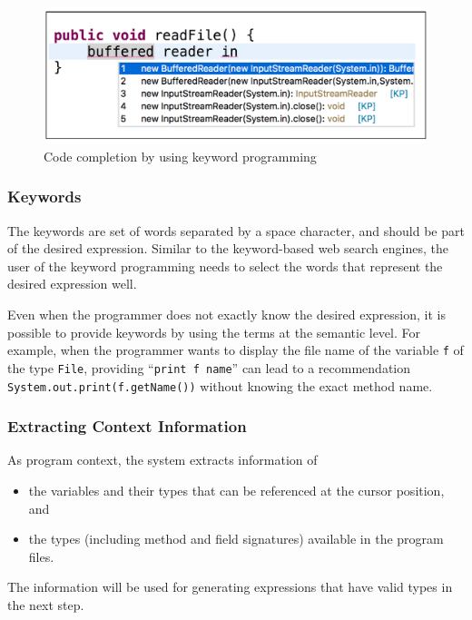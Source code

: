 \documentclass[PRO,english]{ipsj}
\begin{document}
\begin{figure}[!ht]
\centering
\includegraphics[scale=0.38]{Figure/KeywordProgrammingExample.pdf}
\caption{Code completion by using keyword programming}
\label{fig:KP}
\end{figure}

\subsubsection{Keywords}

The keywords are set of words separated by a space character, and should be part of the desired expression.  Similar to the keyword-based web search engines, the user of the keyword programming needs to select the words that represent the desired expression well.

Even when the programmer does not exactly know the desired expression, it is possible to provide keywords by using the terms at the semantic level.  For example, when the programmer wants to display the file name of the variable \texttt{f} of the type \texttt{File}, providing ``\texttt{print f name}'' can lead to a recommendation \texttt{System.out.print(f.getName())} without knowing the exact method name.


\subsubsection{Extracting Context Information}
As program context, the system extracts information of
\begin{itemize}
\item the variables and their types that can be referenced at the cursor position, and 
\item the types (including method and field signatures) available in the program files.
\end{itemize}
The information will be used for generating expressions that have valid types in the next step.
\end{document}
